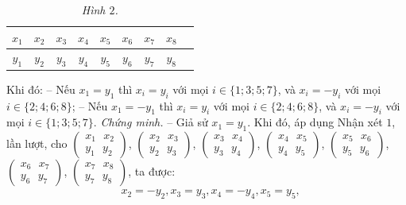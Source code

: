 \begin{multicols}{2}
\begin{table}[H]
\begin{tabular}{|c|c|c|c|c|c|c|c|c|}
			\hline
			$x_1$ & $x_2$ & $x_3$ & $x_4$ & $x_5$ & $x_6$ & $x_7$ & $x_8$ \\
			\hline
			$y_1$ & $y_2$ & $y_3$ & $y_4$ & $y_5$ & $y_6$ & $y_7$ & $y_8$ \\
			\hline
		\end{tabular}
		\caption{\small\textit{\color{thachthuctoanhoc}Hình $2$.}}
		\vspace*{-15pt}
	\end{table}
	Khi đó:
	\vskip 0.05cm
	-- Nếu ${x_1} \!=\! {y_1}$ thì ${x_i} \!=\! {y_i}$  với mọi $i \!\in\!  \{\!1;\! 3;\! 5; \!7\!\}$, và ${x_i} =  - {y_i}$  với mọi $i \in  \{2; 4; 6; 8\}$;
	\vskip 0.05cm
	-- Nếu ${x_1} =  - {y_1}$ thì ${x_i} = {y_i}$ với mọi $i \in  \{2; 4; 6; 8\}$, và  ${x_i} =  - {y_i}$ với mọi \linebreak$i \in  \{1; 3; 5; 7\}$.
	\vskip 0.05cm
	\textit{Chứng minh.}
	\vskip 0.05cm
	-- Giả sử  $x_1 = y_1$. Khi đó, áp dụng Nhận xét $1$, lần lượt, cho  $\left(\!\!\! \begin{array}{l}
		{x_1}\,\,\,\,{x_2}\\
		{y_1}\,\,\,\,{y_2}
	\end{array} \!\!\!\right)$,  $\left(\!\!\! \begin{array}{l}
	{x_2}\,\,\,\,{x_3}\\
	{y_2}\,\,\,\,{y_3}
\end{array} \!\!\!\right)$,  $\left(\!\!\! \begin{array}{l}
{x_3}\,\,\,\,{x_4}\\
{y_3}\,\,\,\,{y_4}
\end{array} \!\!\!\right)$,
$\left(\!\!\!\! \begin{array}{l}
	{x_4}\,\,\,\,{x_5}\\
	{y_4}\,\,\,\,{y_5}
\end{array} \!\!\!\right)$,
 $\left(\!\!\! \begin{array}{l}
{x_5}\,\,\,\,{x_6}\\
{y_5}\,\,\,\,{y_6}
\end{array} \!\!\!\right)$,  $\left(\!\!\! \begin{array}{l}
{x_6}\,\,\,\,{x_7}\\
{y_6}\,\,\,\,{y_7}
\end{array} \!\!\!\right)$,  $\left(\!\!\! \begin{array}{l}
{x_7}\,\,\,\,{x_8}\\
{y_7}\,\,\,\,{y_8}
\end{array} \!\!\!\right)$,  ta được:
	\begin{align*}
		&{x_2} =  - {y_2}, x_3 = y_3, x_4 = - y_4, x_5 = y_5,\\

\end{align*}
\end{multicols}
